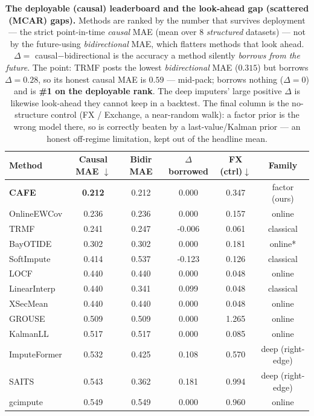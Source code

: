 \begin{table}[tbp]\centering\small
\setlength{\tabcolsep}{4pt}
\caption{\textbf{The deployable (causal) leaderboard and the look-ahead gap (scattered (MCAR) gaps).} Methods are ranked by the number that survives deployment --- the strict point-in-time \emph{causal} MAE (mean over 8 \emph{structured} datasets) --- not by the future-using \emph{bidirectional} MAE, which flatters methods that look ahead. $\Delta=$ causal$-$bidirectional is the accuracy a method silently \emph{borrows from the future}. The point: TRMF posts the lowest \emph{bidirectional} MAE ($0.315$) but borrows $\Delta\!=\!0.28$, so its honest causal MAE is $0.59$ --- mid-pack; \cafe{} borrows nothing ($\Delta=0$) and is \textbf{\#1 on the deployable rank}. The deep imputers' large positive $\Delta$ is likewise look-ahead they cannot keep in a backtest. The final column is the no-structure control (FX / Exchange, a near-random walk): a factor prior is the wrong model there, so \cafe{} is correctly beaten by a last-value/Kalman prior --- an honest off-regime limitation, kept out of the headline mean.}
\label{tab:bidirracemcar}
\begin{tabular}{@{}lccccc@{}}
\toprule
Method & Causal MAE $\downarrow$ & Bidir MAE & $\Delta$ borrowed & FX (ctrl)$\downarrow$ & Family \\
\midrule
\textbf{CAFE} & \textbf{0.212} & 0.212 & 0.000 & 0.347 & factor (ours) \\
OnlineEWCov & 0.236 & 0.236 & 0.000 & 0.157 & online \\
TRMF & 0.241 & 0.247 & -0.006 & 0.061 & classical \\
BayOTIDE & 0.302 & 0.302 & 0.000 & 0.181 & online* \\
SoftImpute & 0.414 & 0.537 & -0.123 & 0.126 & classical \\
LOCF & 0.440 & 0.440 & 0.000 & 0.048 & online \\
LinearInterp & 0.440 & 0.341 & 0.099 & 0.048 & classical \\
XSecMean & 0.440 & 0.440 & 0.000 & 0.048 & online \\
GROUSE & 0.509 & 0.509 & 0.000 & 1.265 & online \\
KalmanLL & 0.517 & 0.517 & 0.000 & 0.085 & online \\
ImputeFormer & 0.532 & 0.425 & 0.108 & 0.570 & deep (right-edge) \\
SAITS & 0.543 & 0.362 & 0.181 & 0.994 & deep (right-edge) \\
gcimpute & 0.549 & 0.549 & 0.000 & 0.960 & online \\

\end{tabular}
\end{table}
